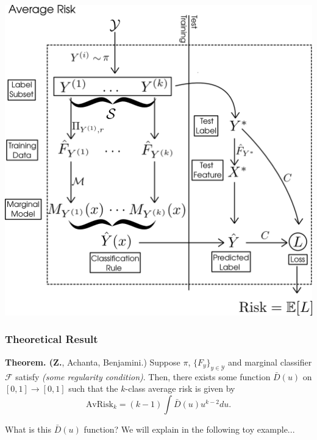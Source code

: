 \documentclass{beamer}
\begin{document}
\begin{frame}

\begin{center}
\includegraphics[scale = 0.2]{../info_theory_paper/extrapolation_figures/average_risk.png}
\end{center}
\end{frame}


\begin{frame}
\frametitle{Theoretical Result}

\textbf{Theorem. (Z.}, Achanta, Benjamini.)
Suppose $\pi$, $\{F_y\}_{y \in \mathcal{Y}}$ and marginal classifier
$\mathcal{F}$ satisfy \emph{(some regularity condition)}.  Then, 
there exists some function $\bar{D}(u)$ on $[0,1] \to [0,1]$ such that
the $k$-class average risk is given by
\[
\text{AvRisk}_k = (k-1) \int \bar{D}(u) u^{k-2} du.
\]
\pause

\vspace{1in}
What is this $\bar{D}(u)$ function? We will explain in the following toy example...
\end{frame}
\end{document}
